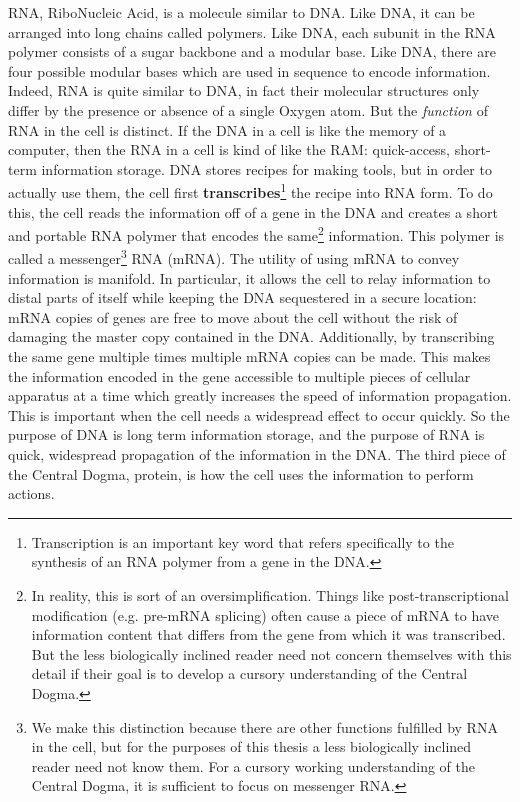 \documentclass[12pt,twoside]{reedthesis}
\begin{document}
	RNA, RiboNucleic Acid, is a molecule similar to DNA. Like DNA, it can be arranged into long chains called polymers. Like DNA, each subunit in the RNA polymer consists of a sugar backbone and a modular base. Like DNA, there are four possible modular bases which are used in sequence to encode information. Indeed, RNA is quite similar to DNA, in fact their molecular structures only differ by the presence or absence of a single Oxygen atom. But the \textit{function} of RNA in the cell is distinct. If the DNA in a cell is like the memory of a computer, then the RNA in a cell is kind of like the RAM: quick-access, short-term information storage. DNA stores recipes for making tools, but in order to actually use them, the cell first \textbf{transcribes}\footnote{Transcription is an important key word that refers specifically to the synthesis of an RNA polymer from a gene in the DNA.} the recipe into RNA form. To do this, the cell reads the information off of a gene in the DNA and creates a short and portable RNA polymer that encodes the same\footnote{In reality, this is sort of an oversimplification. Things like post-transcriptional modification (e.g. pre-mRNA splicing) often cause a piece of mRNA to have information content that differs from the gene from which it was transcribed. But the less biologically inclined reader need not concern themselves with this detail if their goal is to develop a cursory understanding of the Central Dogma.} information. This polymer is called a messenger\footnote{We make this distinction because there are other functions fulfilled by RNA in the cell, but for the purposes of this thesis a less biologically inclined reader need not know them. For a cursory working understanding of the Central Dogma, it is sufficient to focus on messenger RNA.} RNA (mRNA). The utility of using mRNA to convey information is manifold. In particular, it allows the cell to relay information to distal parts of itself while keeping the DNA sequestered in a secure location: mRNA copies of genes are free to move about the cell without the risk of damaging the master copy contained in the DNA. Additionally, by transcribing the same gene multiple times multiple mRNA copies can be made. This makes the information encoded in the gene accessible to multiple pieces of cellular apparatus at a time which greatly increases the speed of information propagation. This is important when the cell needs a widespread effect to occur quickly. So the purpose of DNA is long term information storage, and the purpose of RNA is quick, widespread propagation of the information in the DNA. The third piece of the Central Dogma, protein, is how the cell uses the information to perform actions. \par
\end{document}
